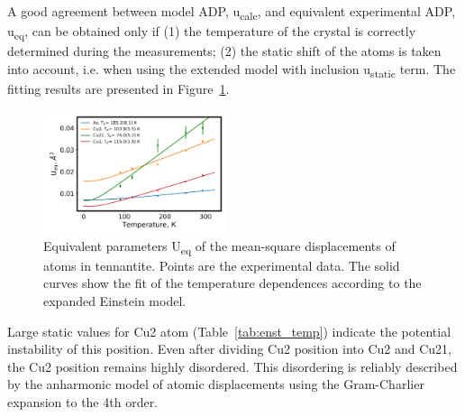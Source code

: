 \documentclass[preprint,review,12pt]{elsarticle}
\begin{document}
A good agreement between model ADP, u\textsubscript{calc}, and equivalent experimental ADP, u\textsubscript{eq}, can be obtained only if (1) the temperature of the crystal is correctly determined during the measurements; (2) the static shift of the atoms is taken into account, i.e. when using the extended model with  inclusion u\textsubscript{static} term. The fitting results are presented in Figure~\ref{fig:enst_temp}.

\begin{figure}[ht]
\centering
\includegraphics[width=0.48\textwidth]{ADP_aproximation_eng}%
\caption{\label{fig:enst_temp} Equivalent parameters U\textsubscript{eq} of the mean-square displacements of atoms in tennantite. Points are the experimental data. The solid curves show the fit of the temperature dependences according to the expanded Einstein model.}
\end{figure}

Large static values for Cu2 atom (Table~\ref{tab:enst_temp}) indicate the potential instability of this position. Even after dividing Cu2 position into Cu2 and Cu21, the Cu2 position remains highly disordered. This disordering is reliably described by the anharmonic model of atomic displacements using the Gram-Charlier expansion to the 4th order.
\end{document}
